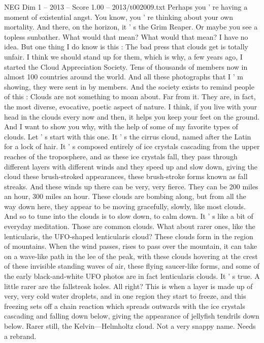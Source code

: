 \begin{textsample}{NEG Dim 1 – 2013 – Score 1.00 – 2013/t002009.txt}
Perhaps you ' re having a moment of existential angst.
You know, you ' re thinking about your own mortality.
And there, on the horizon, it ' s the Grim Reaper.
Or maybe you see a topless sunbather.
What would that mean?
What would that mean?
I have no idea.
But one thing I do know is this : The bad press that clouds get is totally unfair.
I think we should stand up for them, which is why, a few years ago, I started the Cloud Appreciation Society.
Tens of thousands of members now in almost 100 countries around the world.
And all these photographs that I ' m showing, they were sent in by members.
And the society exists to remind people of this : Clouds are not something to moan about.
Far from it.
They are, in fact, the most diverse, evocative, poetic aspect of nature.
I think, if you live with your head in the clouds every now and then, it helps you keep your feet on the ground.
And I want to show you why, with the help of some of my favorite types of clouds.
Let ' s start with this one.
It ' s the cirrus cloud, named after the Latin for a lock of hair.
It ' s composed entirely of ice crystals cascading from the upper reaches of the troposphere, and as these ice crystals fall, they pass through different layers with different winds and they speed up and slow down, giving the cloud these brush-stroked appearances, these brush-stroke forms known as fall streaks.
And these winds up there can be very, very fierce.
They can be 200 miles an hour, 300 miles an hour.
These clouds are bombing along, but from all the way down here, they appear to be moving gracefully, slowly, like most clouds.
And so to tune into the clouds is to slow down, to calm down.
It ' s like a bit of everyday meditation.
Those are common clouds.
What about rarer ones, like the lenticularis, the UFO-shaped lenticularis cloud?
These clouds form in the region of mountains.
When the wind passes, rises to pass over the mountain, it can take on a wave-like path in the lee of the peak, with these clouds hovering at the crest of these invisible standing waves of air, these flying saucer-like forms, and some of the early black-and-white UFO photos are in fact lenticularis clouds.
It ' s true.
A little rarer are the fallstreak holes.
All right?
This is when a layer is made up of very, very cold water droplets, and in one region they start to freeze, and this freezing sets off a chain reaction which spreads outwards with the ice crystals cascading and falling down below, giving the appearance of jellyfish tendrils down below.
Rarer still, the Kelvin—Helmholtz cloud.
Not a very snappy name.
Needs a rebrand.

\end{textsample}
